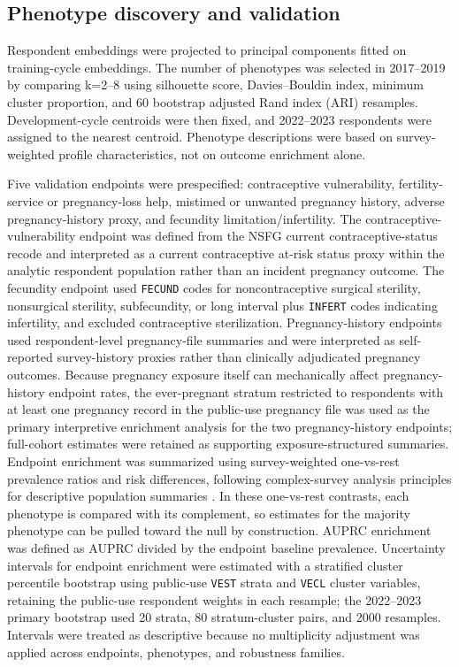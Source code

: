 \documentclass[referee,pdflatex,sn-basic,Numbered]{sn-jnl}
\begin{document}
\subsection{Phenotype discovery and validation}

Respondent embeddings were projected to principal components fitted on training-cycle embeddings. The number of phenotypes was selected in 2017--2019 by comparing k=2--8 using silhouette score, Davies--Bouldin index, minimum cluster proportion, and 60 bootstrap adjusted Rand index (ARI) resamples. Development-cycle centroids were then fixed, and 2022--2023 respondents were assigned to the nearest centroid. Phenotype descriptions were based on survey-weighted profile characteristics, not on outcome enrichment alone.

Five validation endpoints were prespecified: contraceptive vulnerability, fertility-service or pregnancy-loss help, mistimed or unwanted pregnancy history, adverse pregnancy-history proxy, and fecundity limitation/infertility. The contraceptive-vulnerability endpoint was defined from the NSFG current contraceptive-status recode and interpreted as a current contraceptive at-risk status proxy within the analytic respondent population rather than an incident pregnancy outcome. The fecundity endpoint used \texttt{FECUND} codes for noncontraceptive surgical sterility, nonsurgical sterility, subfecundity, or long interval plus \texttt{INFERT} codes indicating infertility, and excluded contraceptive sterilization. Pregnancy-history endpoints used respondent-level pregnancy-file summaries and were interpreted as self-reported survey-history proxies rather than clinically adjudicated pregnancy outcomes. Because pregnancy exposure itself can mechanically affect pregnancy-history endpoint rates, the ever-pregnant stratum restricted to respondents with at least one pregnancy record in the public-use pregnancy file was used as the primary interpretive enrichment analysis for the two pregnancy-history endpoints; full-cohort estimates were retained as supporting exposure-structured summaries. Endpoint enrichment was summarized using survey-weighted one-vs-rest prevalence ratios and risk differences, following complex-survey analysis principles for descriptive population summaries \cite{lumley_survey}. In these one-vs-rest contrasts, each phenotype is compared with its complement, so estimates for the majority phenotype can be pulled toward the null by construction. AUPRC enrichment was defined as AUPRC divided by the endpoint baseline prevalence. Uncertainty intervals for endpoint enrichment were estimated with a stratified cluster percentile bootstrap using public-use \texttt{VEST} strata and \texttt{VECL} cluster variables, retaining the public-use respondent weights in each resample; the 2022--2023 primary bootstrap used 20 strata, 80 stratum-cluster pairs, and 2000 resamples. Intervals were treated as descriptive because no multiplicity adjustment was applied across endpoints, phenotypes, and robustness families.
\end{document}
